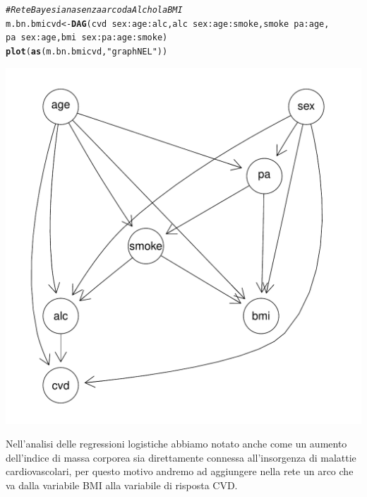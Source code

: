 \documentclass{article}\usepackage[]{graphicx}\usepackage[]{xcolor}
\makeatletter
\def\maxwidth{ %
  \ifdim\Gin@nat@width>\linewidth
    \linewidth
  \else
    \Gin@nat@width
  \fi
}
\newcommand{\hlstr}[1]{\textcolor[rgb]{0.192,0.494,0.8}{#1}}%
\newcommand{\hlcom}[1]{\textcolor[rgb]{0.678,0.584,0.686}{\textit{#1}}}%
\newcommand{\hlopt}[1]{\textcolor[rgb]{0,0,0}{#1}}%
\newcommand{\hlstd}[1]{\textcolor[rgb]{0.345,0.345,0.345}{#1}}%
\newcommand{\hlkwb}[1]{\textcolor[rgb]{0.69,0.353,0.396}{#1}}%
\newcommand{\hlkwd}[1]{\textcolor[rgb]{0.737,0.353,0.396}{\textbf{#1}}}%
\newenvironment{kframe}{%
 \def\at@end@of@kframe{}%
 \ifinner\ifhmode%
  \def\at@end@of@kframe{\end{minipage}}%
  \begin{minipage}{\columnwidth}%
 \fi\fi%
 \def\FrameCommand##1{\hskip\@totalleftmargin \hskip-\fboxsep
 \colorbox{shadecolor}{##1}\hskip-\fboxsep
     \hskip-\linewidth \hskip-\@totalleftmargin \hskip\columnwidth}%
 \MakeFramed {\advance\hsize-\width
   \@totalleftmargin\z@ \linewidth\hsize
   \@setminipage}}%
 {\par\unskip\endMakeFramed%
 \at@end@of@kframe}
\newenvironment{knitrout}{}{} %
\makeatother
\begin{document}
\begin{knitrout}
\color{fgcolor}\begin{kframe}
\begin{alltt}
\hlcom{#Rete Bayesiana senza arco da Alchol a BMI}
\hlstd{m.bn.bmicvd} \hlkwb{<-} \hlkwd{DAG}\hlstd{(cvd}\hlopt{~}\hlstd{sex}\hlopt{:}\hlstd{age}\hlopt{:}\hlstd{alc, alc}\hlopt{~}\hlstd{sex}\hlopt{:}\hlstd{age}\hlopt{:}\hlstd{smoke, smoke}\hlopt{~}\hlstd{pa}\hlopt{:}\hlstd{age,}
                   \hlstd{pa}\hlopt{~}\hlstd{sex}\hlopt{:}\hlstd{age, bmi}\hlopt{~}\hlstd{sex}\hlopt{:}\hlstd{pa}\hlopt{:}\hlstd{age}\hlopt{:}\hlstd{smoke)}
\hlkwd{plot}\hlstd{(}\hlkwd{as}\hlstd{(m.bn.bmicvd,} \hlstr{"graphNEL"}\hlstd{))}
\end{alltt}
\end{kframe}
\includegraphics[width=\maxwidth]{figure/Rete_Bayesiana_senza_arco_tra_Alchol_e_BMI-1} 
\end{knitrout}
    
    Nell'analisi delle regressioni logistiche abbiamo notato anche come un aumento 
    dell'indice di massa corporea sia direttamente connessa all'insorgenza di 
    malattie cardiovascolari, per questo motivo andremo ad aggiungere nella rete
    un arco che va dalla variabile BMI alla variabile di risposta CVD.
    
\end{document}
